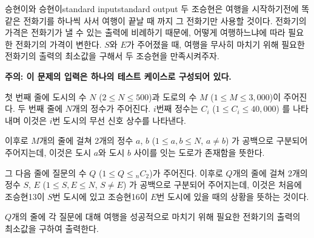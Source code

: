 \begin{problem}{승현이와 승현이}{standard input}{standard output}
두 조승현은 여행을 시작하기전에 똑같은 전화기를 하나씩 사서 여행이 끝날 때 까지 그 전화기만 사용할 것이다. 전화기의 가격은 전화기가 낼 수 있는 출력에 비례하기 때문에, 어떻게 여행하느냐에 따라 필요한 전화기의 가격이 변한다. $S$와 $E$가 주어졌을 때, 여행을 무사히 마치기 위해 필요한 전화기의 출력의 최소값을 구해서 두 조승현을 만족시켜주자.

\InputFile
\textbf{주의: 이 문제의 입력은 하나의 테스트 케이스로 구성되어 있다.}

첫 번째 줄에 도시의 수 $N$ ($2 \le N \le 500$)과 도로의 수 $M$ ($1 \le M \le 3,000$)이 주어진다. 두 번째 줄에 $N$개의 정수가 주어진다. $i$번째 정수는 $C_i$ ($1 \le C_i \le 40,000$) 를 나타내며 이것은 $i$번 도시의 무선 신호 상수를 나타낸다.

이후로 $M$개의 줄에 걸쳐 2개의 정수 $a$, $b$ ($1 \le a, b \le N$, $a \ne b$) 가 공백으로 구분되어 주어지는데, 이것은 도시 $a$와 도시 $b$ 사이를 잇는 도로가 존재함을 뜻한다.

그 다음 줄에 질문의 수 $Q$ ($1 \le Q \le {}_{n}C_2$)가 주어진다. 이후로 $Q$개의 줄에 걸쳐 2개의 정수 $S$, $E$ ($1 \le S, E \le N$, $S \ne E$) 가 공백으로 구분되어 주어지는데, 이것은 처음에 조승현13이 $S$번 도시에 있고 조승현16이 $E$번 도시에 있을 때의 상황을 뜻하는 것이다.

\OutputFile
$Q$개의 줄에 각 질문에 대해 여행을 성공적으로 마치기 위해 필요한 전화기의 출력의 최소값을 구하여 출력한다.

\Example

\begin{example}
%
\end{example}

\end{problem}
